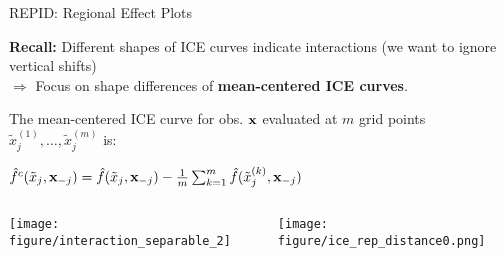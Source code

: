 \documentclass[11pt,compress,t,notes=noshow, aspectratio=169, xcolor=table,dvipsnames]{beamer}
\begin{document}
\begin{frame}{REPID: Regional Effect Plots }

\textbf{Recall:} Different shapes of ICE curves indicate interactions (we want to ignore vertical shifts)\\
$\Rightarrow$ Focus on shape differences of {\color{cice}\bfseries mean-centered ICE curves}.
    

The mean-centered ICE curve for obs. $\mathbf{x}$ evaluated at $m$ grid points $\tilde x_j^{(1)}, \dots, \tilde x_j^{(m)}$ is:

{\color{cice}
\centerline{$\hat f^c(\tilde x_j, \mathbf{x}_{-j}) = \hat{f}(\tilde x_j, \mathbf{x}_{-j}) - \frac{1}{m} \sum\nolimits_{k=1}^m \hat{f}(\tilde x_j^{(k)}, \mathbf{x}_{-j})$}}

\begin{columns}
    \begin{column}{0.39\textwidth}
        \texttt{[image: figure/interaction\_separable\_2]}
    \end{column}
    \begin{column}{0.61\textwidth}
        \texttt{[image: figure/ice\_rep\_distance0.png]} 
    \end{column}
\end{columns}

\end{frame}
\end{document}
